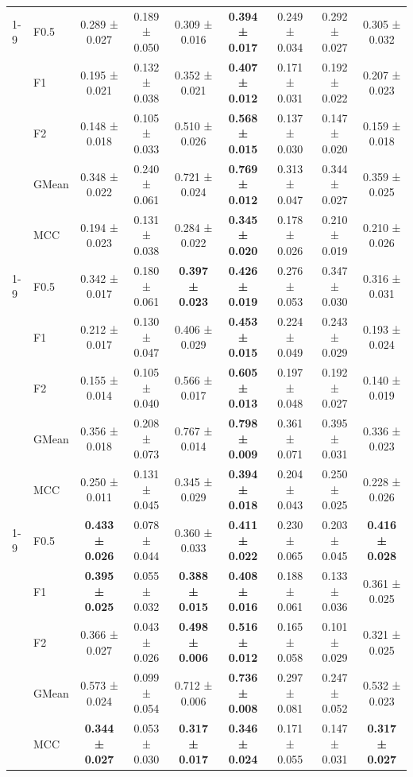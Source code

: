 \begin{table}[H]
{\begin{tabular}{llccccccc}
\cline{1-9}
\multirow[t]{5}{*}{RandomForest} & F0.5 & 0.289 ± 0.027 & 0.189 ± 0.050 & 0.309 ± 0.016 & \textbf{0.394 ± 0.017} & 0.249 ± 0.034 & 0.292 ± 0.027 & 0.305 ± 0.032 \\
 & F1 & 0.195 ± 0.021 & 0.132 ± 0.038 & 0.352 ± 0.021 & \textbf{0.407 ± 0.012} & 0.171 ± 0.031 & 0.192 ± 0.022 & 0.207 ± 0.023 \\
 & F2 & 0.148 ± 0.018 & 0.105 ± 0.033 & 0.510 ± 0.026 & \textbf{0.568 ± 0.015} & 0.137 ± 0.030 & 0.147 ± 0.020 & 0.159 ± 0.018 \\
 & GMean & 0.348 ± 0.022 & 0.240 ± 0.061 & 0.721 ± 0.024 & \textbf{0.769 ± 0.012} & 0.313 ± 0.047 & 0.344 ± 0.027 & 0.359 ± 0.025 \\
 & MCC & 0.194 ± 0.023 & 0.131 ± 0.038 & 0.284 ± 0.022 & \textbf{0.345 ± 0.020} & 0.178 ± 0.026 & 0.210 ± 0.019 & 0.210 ± 0.026 \\
\cline{1-9}
\multirow[t]{5}{*}{TabICL} & F0.5 & 0.342 ± 0.017 & 0.180 ± 0.061 & \textbf{0.397 ± 0.023} & \textbf{0.426 ± 0.019} & 0.276 ± 0.053 & 0.347 ± 0.030 & 0.316 ± 0.031 \\
 & F1 & 0.212 ± 0.017 & 0.130 ± 0.047 & 0.406 ± 0.029 & \textbf{0.453 ± 0.015} & 0.224 ± 0.049 & 0.243 ± 0.029 & 0.193 ± 0.024 \\
 & F2 & 0.155 ± 0.014 & 0.105 ± 0.040 & 0.566 ± 0.017 & \textbf{0.605 ± 0.013} & 0.197 ± 0.048 & 0.192 ± 0.027 & 0.140 ± 0.019 \\
 & GMean & 0.356 ± 0.018 & 0.208 ± 0.073 & 0.767 ± 0.014 & \textbf{0.798 ± 0.009} & 0.361 ± 0.071 & 0.395 ± 0.031 & 0.336 ± 0.023 \\
 & MCC & 0.250 ± 0.011 & 0.131 ± 0.045 & 0.345 ± 0.029 & \textbf{0.394 ± 0.018} & 0.204 ± 0.043 & 0.250 ± 0.025 & 0.228 ± 0.026 \\
\cline{1-9}
\multirow[t]{5}{*}{TabM} & F0.5 & \textbf{0.433 ± 0.026} & 0.078 ± 0.044 & 0.360 ± 0.033 & \textbf{0.411 ± 0.022} & 0.230 ± 0.065 & 0.203 ± 0.045 & \textbf{0.416 ± 0.028} \\
 & F1 & \textbf{0.395 ± 0.025} & 0.055 ± 0.032 & \textbf{0.388 ± 0.015} & \textbf{0.408 ± 0.016} & 0.188 ± 0.061 & 0.133 ± 0.036 & 0.361 ± 0.025 \\
 & F2 & 0.366 ± 0.027 & 0.043 ± 0.026 & \textbf{0.498 ± 0.006} & \textbf{0.516 ± 0.012} & 0.165 ± 0.058 & 0.101 ± 0.029 & 0.321 ± 0.025 \\
 & GMean & 0.573 ± 0.024 & 0.099 ± 0.054 & 0.712 ± 0.006 & \textbf{0.736 ± 0.008} & 0.297 ± 0.081 & 0.247 ± 0.052 & 0.532 ± 0.023 \\
 & MCC & \textbf{0.344 ± 0.027} & 0.053 ± 0.030 & \textbf{0.317 ± 0.017} & \textbf{0.346 ± 0.024} & 0.171 ± 0.055 & 0.147 ± 0.031 & \textbf{0.317 ± 0.027} \\

\end{tabular}}
\end{table}
